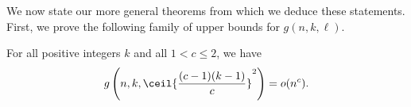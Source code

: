 We now state our more general theorems from which we deduce these statements. First, we prove the following family of upper bounds for $g(n, k, \ell)$. 

\begin{theorem}\label{thm:upper-bound}
    For all positive integers $k$ and all $1 < c \leq 2$, we have \[g\left(n, k, \ceil{\frac{(c - 1)(k - 1)}{c}}^2\right) = o(n^c).\] 
\end{theorem}
